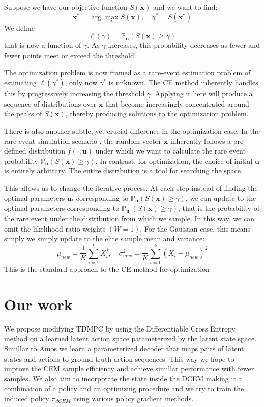 \documentclass{article}
\begin{document}
Suppose we have our objective function $S(\mathbf{x})$ and we want to find:
\begin{equation}
\mathbf{x}^*= \arg \max_\mathbf{x} S(\mathbf{x}), \quad \gamma^* = S(\mathbf{x}^*)
\end{equation}
We define 
\begin{equation}
\ell(\gamma)= \mathbb{P}_{\mathbf{u}}(S(\mathbf{x}) \geq \gamma) 
\end{equation}
that is now a function of $\gamma$. As $\gamma$ increases, this probability decreases as fewer and fewer points meet or exceed the threshold.

The optimization problem is now framed as a rare-event estimation problem of estimating $\ell(\gamma^*)$, only now $\gamma^*$ is unknown. The CE method inherently handles this by progressively increasing the threshold $\gamma$. Applying it here will produce a sequence of distributions over $\mathbf{x}$ that become increasingly concentrated around the peaks of $S(\mathbf{x})$, thereby producing solutions to the optimization problem.

There is also another subtle, yet crucial difference in the optimization case. In the rare-event simulation scenario , the random vector $\mathbf{x}$ inherently follows a pre-defined distribution $f(\cdot;\mathbf{u})$ under which we want to calculate the rare event probability $\mathbb{P}_{\mathbf{u}}(S(\mathbf{x}) \geq \gamma)$. In contrast, for optimization, the choice of initial $\mathbf{u}$ is entirely arbitrary. The entire distribution is a tool for searching the space. 

This allows us to change the iterative process. At each step  instead of finding the optimal parameters $\mathbf{u}_t$ corresponding to $\mathbb{P}_{\mathbf{u}}(S(\mathbf{x}) \geq \gamma)$, we can update to the optimal parameters corresponding to  $\mathbb{P}_{\mathbf{u}_t}(S(\mathbf{x}) \geq \gamma)$, that is the probability of the rare event under the distribution from which we sample. In this way, we can omit the likelihood ratio weights $(W=1)$. For the Gaussian case, this means simply we simply update to the elite sample mean and variance:
\begin{equation}
\mu_{new} = \frac{1}{K}\sum_{i=1}^{k} X^j_i, \quad 
\sigma^2_{new} = \frac{1}{K}\sum_{i=1}^{k} (X_i - \mu_{new})^2
\end{equation}
This is the standard approach to the CE method for optimization

\section{Our work}
We propose modifying TDMPC by using the Differentiable Cross Entropy method on a learned latent action space parameterized by the latent state space. Simillar to Amos we learn a parameterized decoder that maps pairs of latent states and actions to ground truth action sequences. This way we hope to improve the CEM sample efficiency and achieve simillar performance with fewer samples. We also aim to incorporate the state inside the DCEM making it a combination of a policy and an optimizing procedure and we try to train the induced policy $\pi_{dCEM}$ using various policy gradient methods. 
\end{document}
